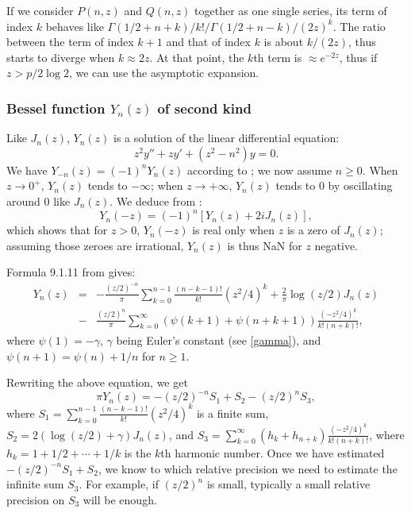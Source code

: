 \documentclass[12pt]{amsart}
\begin{document}
If we consider $P(n,z)$ and $Q(n,z)$ together as one single series,
its term of index $k$
behaves like $\Gamma(1/2+n+k)/k!/\Gamma(1/2+n-k)/(2z)^k$.
The ratio between the
term of index $k+1$ and that of index $k$ is about $k/(2z)$, thus starts
to diverge when $k \approx 2z$. At that point, the $k$th term is
$\approx e^{-2z}$, thus if $z > p/2 \log 2$, we can use the asymptotic
expansion.

\subsubsection{Bessel function $Y_n(z)$ of second kind}

Like $J_n(z)$, $Y_n(z)$ is a solution of the linear differential equation:
\[ z^2 y'' + z y' + (z^2-n^2) y = 0. \]
We have $Y_{-n}(z) = (-1)^n Y_n(z)$ according to \cite[Eq.~(9.1.5)]{AbSt73};
we now assume $n \geq 0$.
When $z \rightarrow 0^+$, $Y_n(z)$ tends to $-\infty$; when $z \rightarrow
+\infty$, $Y_n(z)$ tends to $0$ by oscillating around $0$ like $J_n(z)$.
We deduce from \cite[Eq.~(9.23)]{Temme96}:
\[ Y_n(-z) = (-1)^n [Y_n(z) + 2 i J_n(z)], \]
which shows that for $z > 0$, $Y_n(-z)$ is real only when $z$ is a zero of
$J_n(z)$; assuming those zeroes are irrational, $Y_n(z)$ is thus NaN for
$z$ negative.

Formula 9.1.11 from \cite{AbSt73} gives:
\begin{eqnarray*}
Y_n(z) &=& -\frac{(z/2)^{-n}}{\pi} \sum_{k=0}^{n-1} \frac{(n-k-1)!}{k!}
   (z^2/4)^k + \frac{2}{\pi} \log(z/2) J_n(z) \\ &-& \frac{(z/2)^n}{\pi}
  \sum_{k=0}^{\infty} (\psi(k+1) + \psi(n+k+1)) \frac{(-z^2/4)^k}{k! (n+k)!},
\end{eqnarray*}
where $\psi(1)=-\gamma$, $\gamma$ being Euler's constant (see
\textsection\ref{gamma}), and $\psi(n+1) = \psi(n) + 1/n$ for $n \geq 1$.

Rewriting the above equation, we get
\[ \pi Y_n(z) = -(z/2)^{-n} S_1 + S_2 - (z/2)^n S_3, \]
where $S_1 = \sum_{k=0}^{n-1} \frac{(n-k-1)!}{k!} (z^2/4)^k$ is
a finite sum,
$S_2 = 2 (\log(z/2) + \gamma) J_n(z)$, and
$S_3 = \sum_{k=0}^{\infty} (h_k + h_{n+k}) \frac{(-z^2/4)^k}{k! (n+k)!}$,
where $h_k = 1 + 1/2 + \cdots + 1/k$ is the $k$th harmonic number.
Once we have estimated $-(z/2)^{-n} S_1 + S_2$, we know to which relative
precision we need to estimate the infinite sum $S_3$. For example, if
$(z/2)^n$ is small, typically a small relative precision on $S_3$ will be
enough.
\end{document}
